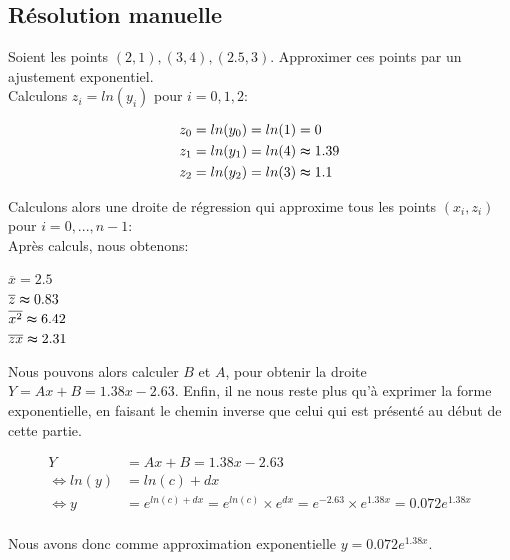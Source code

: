 \subsection{Résolution manuelle}
Soient les points $(2,1), (3,4), (2.5, 3)$. Approximer ces points par un ajustement exponentiel.\\
Calculons $z_i=ln(y_i)$ pour $i=0,1,2$:\\
\begin{center}
    \begin{align*}
        z_0&=ln(y_0)=ln(1)=0\\
        z_1&=ln(y_1)=ln(4)\thickapprox1.39\\
        z_2&=ln(y_2)=ln(3)\thickapprox 1.1\vspace{4pt}\\
    \end{align*}
\end{center}
Calculons alors une droite de régression qui approxime tous les points $(x_i, z_i)$ pour $i=0,..., n-1$:\\
Après calculs, nous obtenons: \\
\begin{center}
    $\overline{x}=2.5$\vspace{3pt}\\
    $\overline{z}\thickapprox0.83$\vspace{3pt}\\
    $\overline{x^2}\thickapprox6.42$\vspace{3pt}\\
    $\overline{zx}\thickapprox2.31$\vspace{3pt}\\
\end{center}
Nous pouvons alors calculer $B$ et $A$, pour obtenir la droite $Y=Ax+B=1.38x-2.63$.
Enfin, il ne nous reste plus qu'à exprimer la forme exponentielle, en faisant le chemin inverse que celui qui est présenté au début de cette partie.\\
\begin{center}
    \begin{align*}
        Y&=Ax+B=1.38x-2.63\\
        \Leftrightarrow ln(y)&=ln (c)+ dx \\
        \Leftrightarrow y&=e^{ln(c)+dx}=e^{ln(c)}\times e^{dx}=e^{-2.63}\times e^{1.38x}=0.072e^{1.38x}\\
    \end{align*}
\end{center}
Nous avons donc comme approximation exponentielle $y=0.072e^{1.38x}$.
